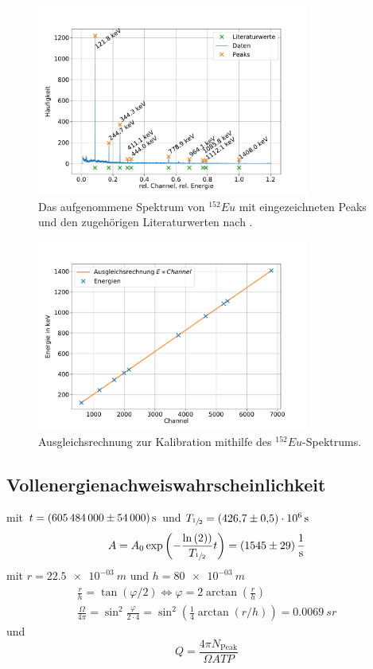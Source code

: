 \begin{figure}[h!]
  \centering
  \includegraphics[width=0.8\textwidth]{content/images/spektrum_europium_kali.pdf}
  \caption{Das aufgenommene Spektrum von $^{152}Eu$ mit eingezeichneten Peaks und den zugehörigen Literaturwerten nach %
  .}
  \label{fig:eu_spect_kali}
\end{figure}

\begin{figure}[h!]
  \centering
  \includegraphics[width=0.8\textwidth]{content/images/kalibration.pdf}
  \caption{Ausgleichsrechnung zur Kalibration mithilfe des $^{152}Eu$-Spektrums.}
  \label{fig:kali}
\end{figure}


\subsection{Vollenergienachweiswahrscheinlichkeit}
mit $t = \SI{605484000 (54000)}{s}$
und $T_{\sfrac{1}{2}} = \SI{426.7 (5) e+06}{s}$ %
\begin{equation*}
	A = A_{0} \exp{\left( - \frac{\ln{(2))}}{T_{\sfrac{1}{2}}} t \right)} = \SI{1545(29)}{\per \second}
\end{equation*}
mit $r=\SI{22.5e-03}{m}$
und $h = \SI{80e-03}{m}$
\begin{align*}
	\frac{r}{h} = \tan{( \varphi / 2 )} \Leftrightarrow \varphi = 2 \arctan{(\frac{r}{h})} \\
	\frac{\Omega}{4 \pi} = \sin^2{\frac{\varphi}{2 \cdot 4}} =  \sin^2{ \left( \frac{1}{4} \arctan{(r/h)} \right)} = \SI{0.0069}{sr}
\end{align*}
und
\begin{equation}
	Q = \frac{4 \pi N_{\text{Peak}}}{\Omega A T P}
\end{equation}

